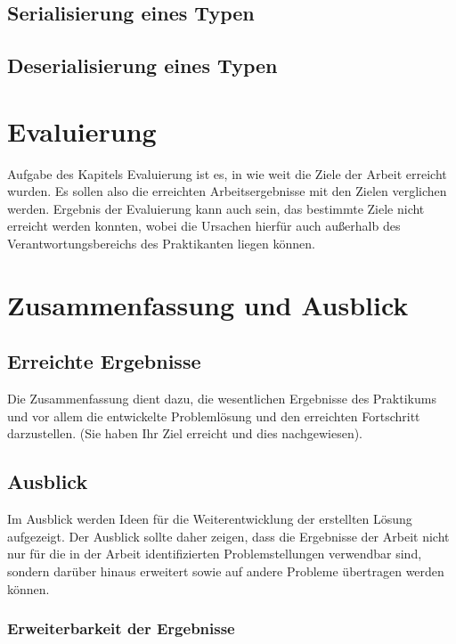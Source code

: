 \documentclass[oneside]{ausarbeitung}
\begin{document}
\section{Serialisierung eines Typen}
\label{sec:cereal_save}

\section{Deserialisierung eines Typen}
\label{sec:cereal_save}

\chapter{Evaluierung}

Aufgabe des Kapitels Evaluierung ist es, in wie weit die Ziele der 
Arbeit erreicht wurden. Es sollen also die erreichten Arbeitsergebnisse 
mit den Zielen verglichen werden. Ergebnis der Evaluierung kann auch 
sein, das bestimmte Ziele nicht erreicht werden konnten, wobei die 
Ursachen hierfür auch außerhalb des Verantwortungsbereichs des 
Praktikanten liegen können.

\chapter{Zusammenfassung und Ausblick}
\label{cha:zusammenfassung}

\section{Erreichte Ergebnisse}
\label{sec:ergebnisse}

Die Zusammenfassung dient dazu, die wesentlichen Ergebnisse des 
Praktikums und vor allem die entwickelte Problemlösung und den 
erreichten Fortschritt darzustellen. (Sie haben Ihr Ziel erreicht und 
dies nachgewiesen).

\section{Ausblick}
\label{sec:ausblick}

Im Ausblick werden Ideen für die Weiterentwicklung der erstellten Lösung 
aufgezeigt. Der Ausblick sollte daher zeigen, dass die Ergebnisse der 
Arbeit nicht nur für die in der Arbeit identifizierten Problemstellungen 
verwendbar sind, sondern darüber hinaus erweitert sowie auf andere 
Probleme übertragen werden können.

\subsection{Erweiterbarkeit der Ergebnisse}
\label{sub:erweiterbarkeit}
\end{document}
